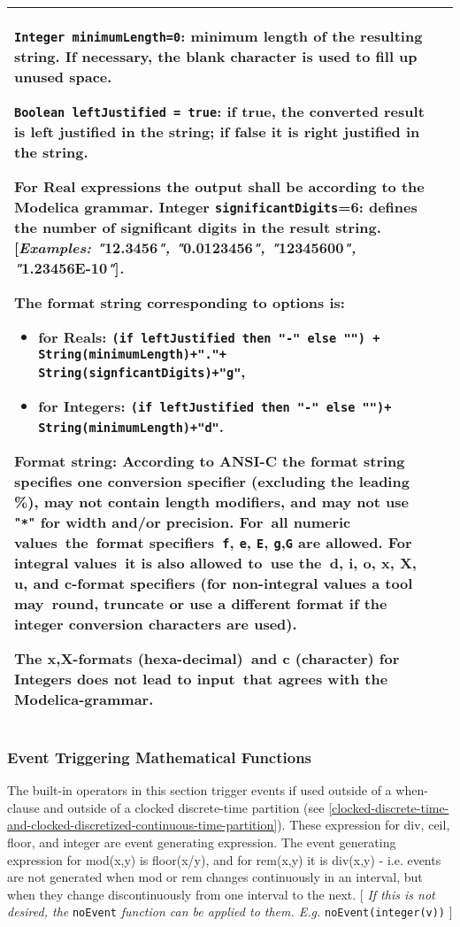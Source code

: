 \begin{longtable}{|p{4.5cm}|p{10cm}|}
\lstinline!Integer minimumLength=0!: minimum length of the resulting string. If
necessary, the blank character is used to fill up unused space.

\lstinline!Boolean leftJustified = true!: if true, the converted result is left
justified in the string; if false it is right justified in the string.

For Real expressions the output shall be according to the Modelica
grammar. Integer \lstinline!significantDigits!=6: defines the number of significant
digits in the result string. {[}\emph{Examples: "}12.3456\emph{",
"}0.0123456\emph{", "}12345600\emph{", "}1.23456E-10\emph{"}{]}\emph{.}

The format string corresponding to options is:

\begin{itemize}
\item
  for Reals: %
  \lstinline!(if leftJustified then "-" else "") +  String(minimumLength)+"."+ String(signficantDigits)+"g"!,
\item
  for Integers: %
  \lstinline!(if leftJustified then "-" else "")+ String(minimumLength)+"d"!.
\end{itemize}

Format string: According to ANSI-C the format string specifies one
conversion specifier (excluding the leading \%), may not contain length
modifiers, and may not use "\lstinline!*!" for width and/or precision. For~all
numeric values~the~format specifiers~\lstinline!f!, \lstinline!e!, \lstinline!E!, \lstinline!g!,\lstinline!G! are allowed. For
integral values~it is also allowed to~use the~d, i, o, x, X, u, and
c-format specifiers (for non-integral values a tool may~round, truncate
or use a different format if the integer conversion characters are
used).

The x,X-formats (hexa-decimal)~and c (character) for Integers does not
lead to input~that agrees with the Modelica-grammar.\\ \hline
\end{longtable}

\subsubsection{Event Triggering Mathematical Functions}

The built-in operators in this section trigger events if used outside of
a when-clause and outside of a clocked discrete-time partition (see
\autoref{clocked-discrete-time-and-clocked-discretized-continuous-time-partition}). 
These expression for div, ceil, floor, and integer are
event generating expression. The event generating expression for
mod(x,y) is floor(x/y), and for rem(x,y) it is div(x,y) - i.e. events
are not generated when mod or rem changes continuously in an interval,
  but when they change discontinuously from one interval to the next. {[}
\emph{If this is not desired, the} \lstinline!noEvent! \emph{function can be applied
to them. E.g.} \lstinline!noEvent(integer(v))! {]}

